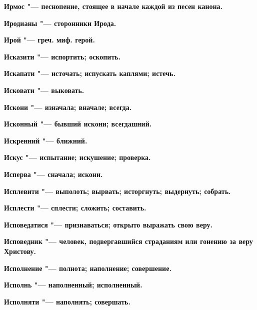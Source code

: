 \begin{mymulticols}{2}
\bfseries Ирмос\normalfont{} "--- песнопение, стоящее в начале каждой из песен канона. 




\bfseries Иродианы\normalfont{} "--- сторонники Ирода. 




\bfseries Ирой\normalfont{} "--- греч. миф. герой. 




\bfseries Исказити\normalfont{} "--- испортить; оскопить. 




\bfseries Искапати\normalfont{} "--- источать; испускать каплями; истечь. 




\bfseries Исковати\normalfont{} "--- выковать. 




\bfseries Искони\normalfont{} "--- изначала; вначале; всегда. 




\bfseries Исконный\normalfont{} "--- бывший искони; всегдашний. 




\bfseries Искренний\normalfont{} "--- ближний. 




\bfseries Искус\normalfont{} "--- испытание; искушение; проверка. 




\bfseries Исперва\normalfont{} "--- сначала; искони. 




\bfseries Исплевити\normalfont{} "--- выполоть; вырвать; исторгнуть; выдернуть; собрать. 




\bfseries Исплести\normalfont{} "--- сплести; сложить; составить. 




\bfseries Исповедатися\normalfont{} "--- признаваться; открыто выражать свою веру. 




\bfseries Исповедник\normalfont{} "--- человек, подвергавшийся страданиям или гонению за веру Христову. 




\bfseries Исполнение\normalfont{} "--- полнота; наполнение; совершение. 




\bfseries Исполнь\normalfont{} "--- наполненный; исполненный. 




\bfseries Исполняти\normalfont{} "--- наполнять; совершать. 





\end{mymulticols}
